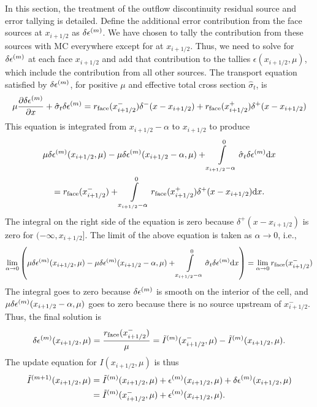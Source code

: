 In this section, the treatment of the outflow discontinuity residual source and error
tallying is detailed.  Define the additional error contribution from the face
sources at $x_{i+1/2}$ as $\delta\epsilon^{(m)}$. We have chosen to tally the contribution from these
sources with MC everywhere except for at $x_{i+1/2}$.  Thus, we need to solve for $\delta\epsilon^{(m)}$
at each face $x_{i+1/2}$ and add that contribution to the tallies
$\epsilon(x_{i+1/2},\mu)$, which include the contribution from all other sources.  The transport equation satisfied by $\delta\epsilon^{(m)}$, for positive
$\mu$ and effective total cross 
section $\hat \sigma_t$, is
\begin{equation}
    \label{eq:ho_face}
    \mu \frac{\partial \delta\epsilon^{(m)}}{\partial x} + \hat\sigma_t \delta\epsilon^{(m)} = r_{\text{face}}(x_{i+1/2}^-)\delta^-(x - x_{i+1/2}) + r_{\text{face}}(x_{i+1/2}^+)\delta^+(x - x_{i+1/2}) 
\end{equation}
This equation is integrated from $x_{i+1/2}-\alpha$ to $x_{i+1/2}$ to produce
\begin{multline}
    \mu\delta\epsilon^{(m)}(x_{i+1/2},\mu) - \mu\delta\epsilon^{(m)}(x_{i+1/2}-\alpha,\mu)  + \int\limits_{x_{i+1/2}-\alpha}^0 
    \hat \sigma_t \delta\epsilon^{(m)} \mathrm{d} x  \\ =  r_{\text{face}}(x_{i+1/2}^-) +
        \int\limits_{x_{i+1/2}-\alpha}^0r_{\text{face}}(x_{i+1/2}^+)\delta^+(x - x_{i+1/2}) \mathrm{d} x.
\end{multline}
The integral on the right side of the equation is zero because $\delta^+(x-x_{i+1/2})$ is
zero for $(-\infty,x_{i+1/2}]$.  The limit of the above equation is taken as $\alpha\to0$, i.e.,
\begin{multline}
    \lim_{\alpha\to0}\left( \mu\delta\epsilon^{(m)}(x_{i+1/2},\mu) - \mu\delta\epsilon^{(m)}(x_{i+1/2}-\alpha,\mu)  + \int\limits_{x_{i+1/2}-\alpha}^0 
    \hat \sigma_t \delta\epsilon^{(m)} \mathrm{d} x \right)  = \lim_{\alpha\to0} r_{\text{face}}(x_{i+1/2}^-) 
\end{multline}
The integral goes to zero because $\delta\epsilon^{(m)}$ is smooth on the interior of the cell, and
$\mu\delta\epsilon^{(m)}(x_{i+1/2}-\alpha,\mu)$ goes to zero because there is no source upstream of
$x_{i+1/2}^-$. Thus, the final solution is
\begin{equation}
    \delta\epsilon^{(m)}(x_{i+1/2},\mu) = \frac{r_{\text{face}}(x_{i+1/2}^-)}{\mu} = 
     \tilde I^{(m)}(x_{i+1/2}^-,\mu) - \tilde I^{(m)}(x_{i+1/2},\mu)
.
\end{equation}
The update equation for $I(x_{i+1/2},\mu)$ is thus
\begin{align}
   \tilde I^{(m+1)}(x_{i+1/2},\mu) &= \tilde I^{(m)}(x_{i+1/2},\mu) + \epsilon^{(m)}(x_{i+1/2},\mu) +
    \delta\epsilon^{(m)}(x_{i+1/2},\mu) \\ 
        &= \tilde I^{(m)}(x_{i+1/2}^-,\mu) + \epsilon^{(m)}(x_{i+1/2},\mu).
\end{align}



